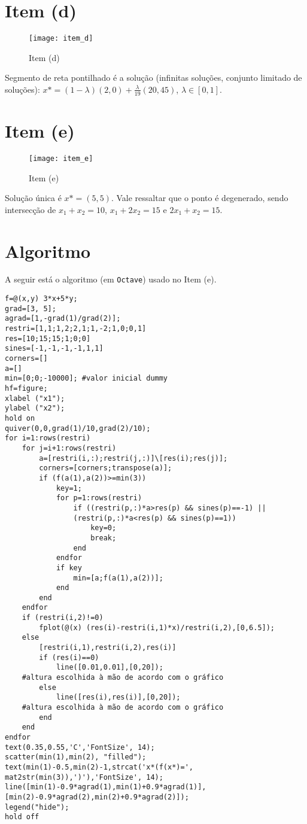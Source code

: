 \documentclass[a4paper, 12pt]{article}
\begin{document}
\section{Item (d)}
\begin{figure}[H]
    \centering
    \caption{\label{fig:4} Item (d)}
    \texttt{[image: item\_d]}
\end{figure}
Segmento de reta pontilhado é a solução (infinitas soluções, conjunto limitado de soluções):  $x*=(1-\lambda)(2,0)+\frac{\lambda}{19}(20,45)$, $\lambda \in [0,1]$.
\section{Item (e)}
\begin{figure}[H]
    \centering
    \caption{\label{fig:5} Item (e)}
    \texttt{[image: item\_e]}
\end{figure}
Solução única é $x*=(5,5)$. Vale ressaltar que o ponto é degenerado, sendo intersecção de $x_1 + x_2 =10$, $x_1 + 2x_2 = 15$ e $2x_1 + x_2 = 15$.
\section{Algoritmo}
A seguir está o algoritmo (em \verb+Octave+) usado no Item (e).
\begin{verbatim}
f=@(x,y) 3*x+5*y;
grad=[3, 5];
agrad=[1,-grad(1)/grad(2)];
restri=[1,1;1,2;2,1;1,-2;1,0;0,1]
res=[10;15;15;1;0;0]
sines=[-1,-1,-1,-1,1,1]
corners=[]
a=[]
min=[0;0;-10000]; #valor inicial dummy
hf=figure;
xlabel ("x1");
ylabel ("x2");
hold on
quiver(0,0,grad(1)/10,grad(2)/10);
for i=1:rows(restri)
    for j=i+1:rows(restri)
        a=[restri(i,:);restri(j,:)]\[res(i);res(j)];
        corners=[corners;transpose(a)];
        if (f(a(1),a(2))>=min(3))
            key=1;
            for p=1:rows(restri)
                if ((restri(p,:)*a>res(p) && sines(p)==-1) || 
                (restri(p,:)*a<res(p) && sines(p)==1))
                    key=0;
                    break;
                end
            endfor
            if key
                min=[a;f(a(1),a(2))];
            end
        end
    endfor
    if (restri(i,2)!=0)
        fplot(@(x) (res(i)-restri(i,1)*x)/restri(i,2),[0,6.5]);
    else
        [restri(i,1),restri(i,2),res(i)]
        if (res(i)==0)
            line([0.01,0.01],[0,20]); 
	#altura escolhida à mão de acordo com o gráfico
        else
            line([res(i),res(i)],[0,20]); 
	#altura escolhida à mão de acordo com o gráfico
        end
    end
endfor
text(0.35,0.55,'C','FontSize', 14);
scatter(min(1),min(2), "filled");
text(min(1)-0.5,min(2)-1,strcat('x*(f(x*)=',
mat2str(min(3)),')'),'FontSize', 14);
line([min(1)-0.9*agrad(1),min(1)+0.9*agrad(1)],
[min(2)-0.9*agrad(2),min(2)+0.9*agrad(2)]);
legend("hide");
hold off
\end{verbatim}
\end{document}
